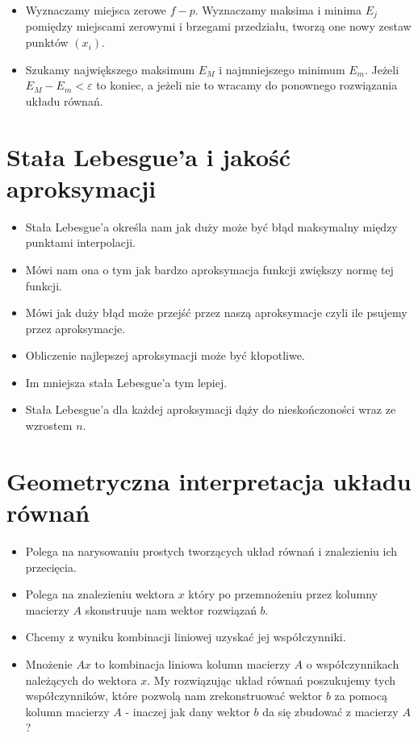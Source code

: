 \documentclass[a4paper]{article}
\begin{document}
\begin{itemize}
    \item Wyznaczamy miejsca zerowe $f - p$. Wyznaczamy maksima i minima $E_j$ pomiędzy miejscami zerowymi i brzegami przedziału, tworzą one nowy zestaw punktów $(x_i)$.
    \item Szukamy największego maksimum $E_M$ i najmniejszego minimum $E_m$. Jeżeli $E_M - E_m < \varepsilon$ to koniec, a jeżeli nie to wracamy do ponownego rozwiązania układu równań.
\end{itemize}

\section{Stała Lebesgue'a i jakość aproksymacji}
\begin{itemize}
    \item Stała Lebesgue’a określa nam jak duży może być błąd maksymalny między punktami interpolacji.
    \item Mówi nam ona o tym jak bardzo aproksymacja funkcji zwiększy normę tej funkcji.
    \item Mówi jak duży błąd może przejść przez naszą aproksymacje czyli ile psujemy przez aproksymacje.
    \item Obliczenie najlepszej aproksymacji może być kłopotliwe.
    \item Im mniejsza stała Lebesgue'a tym lepiej.
    \item Stała Lebesgue’a dla każdej aproksymacji dąży do nieskończoności wraz ze wzrostem $n$.
\end{itemize}

\section{Geometryczna interpretacja układu równań}
\begin{itemize}
    \item Polega na narysowaniu prostych tworzących układ równań i znalezieniu ich przecięcia.
    \item Polega na znalezieniu wektora $x$ który po przemnożeniu przez kolumny macierzy $A$ skonstruuje nam wektor rozwiązań $b$.
    \item Chcemy z wyniku kombinacji liniowej uzyskać jej współczynniki.
    \item Mnożenie $Ax$ to kombinacja liniowa kolumn macierzy $A$ o współczynnikach należących do  wektora $x$. My rozwiązując układ równań poszukujemy tych współczynników, które pozwolą nam zrekonstruować wektor $b$ za pomocą kolumn macierzy $A$ - inaczej jak dany wektor $b$ da się zbudować z macierzy $A$?
\end{itemize}
\end{document}
